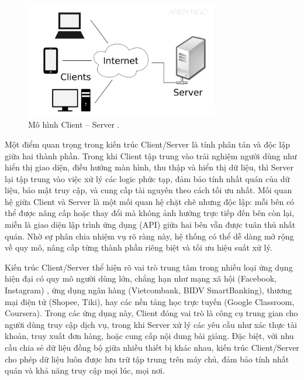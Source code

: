 \begin{figure}[H]
  \centering
  \includegraphics[width=0.75\textwidth]{images/client-server.jpg}
  \caption{Mô hình Client – Server \cite{codelearnClientServer}.}
  \label{fig:fig17}
\end{figure}

    \begin{flushleft}
      \hspace*{0.8cm}Một điểm quan trọng trong kiến trúc Client/Server là tính phân tán và độc lập giữa hai thành phần. Trong khi Client tập trung vào trải nghiệm người dùng như hiển thị giao diện, điều hướng màn hình, thu thập và hiển thị dữ liệu, thì Server lại tập trung vào việc xử lý các logic phức tạp, đảm bảo tính nhất quán của dữ liệu, bảo mật truy cập, và cung cấp tài nguyên theo cách tối ưu nhất. Mối quan hệ giữa Client và Server là một mối quan hệ chặt chẽ nhưng độc lập: mỗi bên có thể được nâng cấp hoặc thay đổi mà không ảnh hưởng trực tiếp đến bên còn lại, miễn là giao diện lập trình ứng dụng (API) giữa hai bên vẫn được tuân thủ nhất quán. Nhờ sự phân chia nhiệm vụ rõ ràng này, hệ thống có thể dễ dàng mở rộng về quy mô, nâng cấp từng thành phần riêng biệt và tối ưu hiệu suất xử lý.
    \end{flushleft}

    \begin{flushleft}
      \hspace*{0.8cm}Kiến trúc Client/Server thể hiện rõ vai trò trung tâm trong nhiều loại ứng dụng hiện đại có quy mô người dùng lớn, chẳng hạn như mạng xã hội (Facebook, Instagram) \cite{social-apps}, ứng dụng ngân hàng (Vietcombank, BIDV SmartBanking), thương mại điện tử (Shopee, Tiki), hay các nền tảng học trực tuyến (Google Classroom, Coursera). Trong các ứng dụng này, Client đóng vai trò là công cụ trung gian cho người dùng truy cập dịch vụ, trong khi Server xử lý các yêu cầu như xác thực tài khoản, truy xuất đơn hàng, hoặc cung cấp nội dung bài giảng. Đặc biệt, với nhu cầu chia sẻ dữ liệu đồng bộ giữa nhiều thiết bị khác nhau, kiến trúc Client/Server cho phép dữ liệu luôn được lưu trữ tập trung trên máy chủ, đảm bảo tính nhất quán và khả năng truy cập mọi lúc, mọi nơi.
    \end{flushleft}

